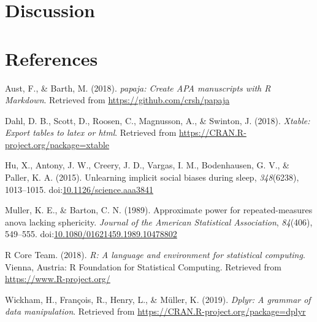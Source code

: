 \documentclass[man,floatsintext]{apa6}
\begin{document}
\section{Discussion}\label{discussion}

\newpage

\section{References}\label{references}

\begingroup
\setlength{\parindent}{-0.5in} \setlength{\leftskip}{0.5in}

\hypertarget{refs}{}
\hypertarget{ref-R-papaja}{}
Aust, F., \& Barth, M. (2018). \emph{papaja: Create APA manuscripts with
R Markdown}. Retrieved from \url{https://github.com/crsh/papaja}

\hypertarget{ref-R-xtable}{}
Dahl, D. B., Scott, D., Roosen, C., Magnusson, A., \& Swinton, J.
(2018). \emph{Xtable: Export tables to latex or html}. Retrieved from
\url{https://CRAN.R-project.org/package=xtable}

\hypertarget{ref-Hu1013}{}
Hu, X., Antony, J. W., Creery, J. D., Vargas, I. M., Bodenhausen, G. V.,
\& Paller, K. A. (2015). Unlearning implicit social biases during sleep,
\emph{348}(6238), 1013--1015.
doi:\href{https://doi.org/10.1126/science.aaa3841}{10.1126/science.aaa3841}

\hypertarget{ref-Keith1989}{}
Muller, K. E., \& Barton, C. N. (1989). Approximate power for
repeated-measures anova lacking sphericity. \emph{Journal of the
American Statistical Association}, \emph{84}(406), 549--555.
doi:\href{https://doi.org/10.1080/01621459.1989.10478802}{10.1080/01621459.1989.10478802}

\hypertarget{ref-R-base}{}
R Core Team. (2018). \emph{R: A language and environment for statistical
computing}. Vienna, Austria: R Foundation for Statistical Computing.
Retrieved from \url{https://www.R-project.org/}

\hypertarget{ref-R-dplyr}{}
Wickham, H., François, R., Henry, L., \& Müller, K. (2019). \emph{Dplyr:
A grammar of data manipulation}. Retrieved from
\url{https://CRAN.R-project.org/package=dplyr}

\endgroup
\end{document}
